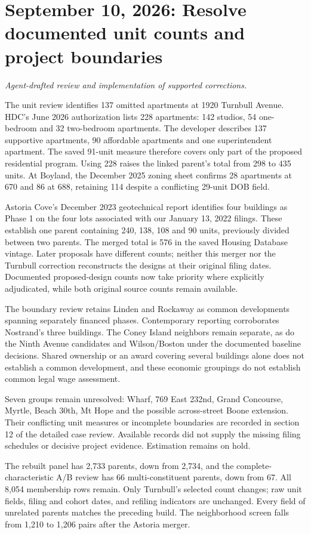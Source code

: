 \clearpage
\section*{September 10, 2026: Resolve documented unit counts and project boundaries}
\textit{Agent-drafted review and implementation of supported corrections.}

The unit review identifies 137 omitted apartments at 1920 Turnbull Avenue. HDC's June 2026 authorization lists 228 apartments: 142 studios, 54 one-bedroom and 32 two-bedroom apartments. The developer describes 137 supportive apartments, 90 affordable apartments and one superintendent apartment. The saved 91-unit measure therefore covers only part of the proposed residential program. Using 228 raises the linked parent's total from 298 to 435 units. At Boyland, the December 2025 zoning sheet confirms 28 apartments at 670 and 86 at 688, retaining 114 despite a conflicting 29-unit DOB field.

Astoria Cove's December 2023 geotechnical report identifies four buildings as Phase 1 on the four lots associated with our January 13, 2022 filings. These establish one parent containing 240, 138, 108 and 90 units, previously divided between two parents. The merged total is 576 in the saved Housing Database vintage. Later proposals have different counts; neither this merger nor the Turnbull correction reconstructs the designs at their original filing dates. Documented proposed-design counts now take priority where explicitly adjudicated, while both original source counts remain available.

The boundary review retains Linden and Rockaway as common developments spanning separately financed phases. Contemporary reporting corroborates Nostrand's three buildings. The Coney Island neighbors remain separate, as do the Ninth Avenue candidates and Wilson/Boston under the documented baseline decisions. Shared ownership or an award covering several buildings alone does not establish a common development, and these economic groupings do not establish common legal wage assessment.

Seven groups remain unresolved: Wharf, 769 East 232nd, Grand Concourse, Myrtle, Beach 30th, Mt Hope and the possible across-street Boone extension. Their conflicting unit measures or incomplete boundaries are recorded in section 12 of the detailed case review. Available records did not supply the missing filing schedules or decisive project evidence. Estimation remains on hold.

The rebuilt panel has 2,733 parents, down from 2,734, and the complete-characteristic A/B review has 66 multi-constituent parents, down from 67. All 8,054 membership rows remain. Only Turnbull's selected count changes; raw unit fields, filing and cohort dates, and refiling indicators are unchanged. Every field of unrelated parents matches the preceding build. The neighborhood screen falls from 1,210 to 1,206 pairs after the Astoria merger.

